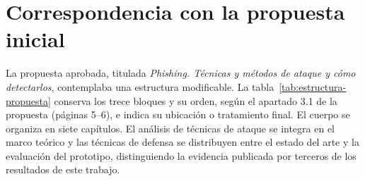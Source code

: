 \section{Correspondencia con la propuesta inicial}
\label{sec:estructura-propuesta}

La propuesta aprobada, titulada \emph{Phishing. Técnicas y métodos de ataque y cómo detectarlos}, contemplaba una estructura modificable. La tabla~\ref{tab:estructura-propuesta} conserva los trece bloques y su orden, según el apartado 3.1 de la propuesta (páginas 5--6), e indica su ubicación o tratamiento final. El cuerpo se organiza en siete capítulos. El análisis de técnicas de ataque se integra en el marco teórico y las técnicas de defensa se distribuyen entre el estado del arte y la evaluación del prototipo, distinguiendo la evidencia publicada por terceros de los resultados de este trabajo.

